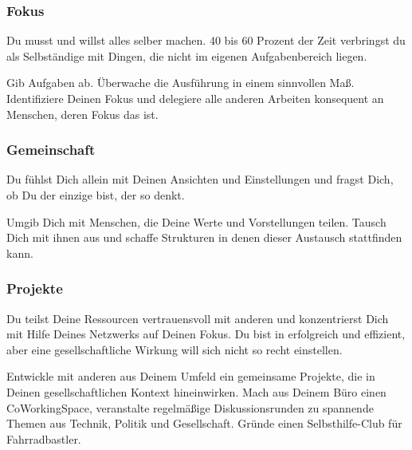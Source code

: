 \subsubsection{Fokus}
\begin{em} Du musst und willst alles selber machen.
%
40 bis 60 Prozent der Zeit verbringst du als Selbständige mit Dingen, die nicht im eigenen Aufgabenbereich liegen.
\end{em}



Gib Aufgaben ab.
%
Überwache die Ausführung in einem sinnvollen Maß.
%
Identifiziere Deinen Fokus und delegiere alle anderen Arbeiten konsequent an Menschen, deren Fokus das ist.

\subsubsection{Gemeinschaft}
\begin{em} Du fühlst Dich allein mit Deinen Ansichten und Einstellungen und fragst Dich, ob Du der einzige bist, 
der so denkt. \end{em}



Umgib Dich mit Menschen, die Deine Werte und Vorstellungen teilen.
%
Tausch Dich mit ihnen aus und schaffe Strukturen in denen dieser Austausch stattfinden kann.



\subsubsection{Projekte}
\begin{em}
Du teilst Deine Ressourcen vertrauensvoll mit anderen und konzentrierst Dich mit Hilfe Deines 
Netzwerks auf Deinen Fokus. Du bist in erfolgreich und effizient, aber eine gesellschaftliche Wirkung 
will sich nicht so recht einstellen.
\end{em}



Entwickle mit anderen aus Deinem Umfeld ein gemeinsame Projekte, die in Deinen gesellschaftlichen Kontext  hineinwirken.  Mach  aus  Deinem  Büro  einen  CoWorkingSpace,  veranstalte  regelmäßige Diskussionsrunden  zu  spannende  Themen  aus  Technik,  Politik  und  Gesellschaft.  Gründe  einen Selbsthilfe-Club für Fahrradbastler.



